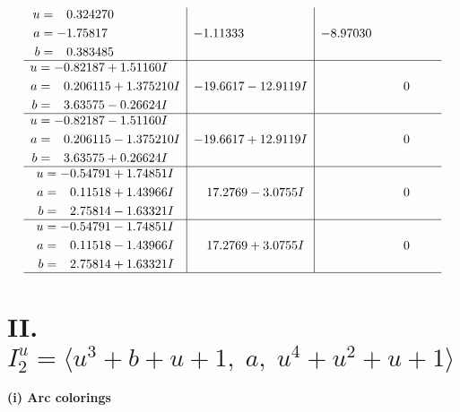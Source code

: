 \documentclass[1p]{elsarticle_modified}
\theoremstyle{definition}
\begin{document}
$$\begin{array}{c|c|c}
\begin{aligned}
u &= \phantom{-}0.324270\phantom{ +0.000000I} \\
a &= -1.75817\phantom{ +0.000000I} \\
b &= \phantom{-}0.383485\phantom{ +0.000000I}\end{aligned}
 & -1.11333\phantom{ +0.000000I} & -8.97030\phantom{ +0.000000I} \\ \hline\begin{aligned}
u &= -0.82187 + 1.51160 I \\
a &= \phantom{-}0.206115 + 1.375210 I \\
b &= \phantom{-}3.63575 - 0.26624 I\end{aligned}
 & -19.6617 - 12.9119 I & \phantom{-0.000000 } 0 \\ \hline\begin{aligned}
u &= -0.82187 - 1.51160 I \\
a &= \phantom{-}0.206115 - 1.375210 I \\
b &= \phantom{-}3.63575 + 0.26624 I\end{aligned}
 & -19.6617 + 12.9119 I & \phantom{-0.000000 } 0 \\ \hline\begin{aligned}
u &= -0.54791 + 1.74851 I \\
a &= \phantom{-}0.11518 + 1.43966 I \\
b &= \phantom{-}2.75814 - 1.63321 I\end{aligned}
 & \phantom{-}17.2769 - 3.0755 I & \phantom{-0.000000 } 0 \\ \hline\begin{aligned}
u &= -0.54791 - 1.74851 I \\
a &= \phantom{-}0.11518 - 1.43966 I \\
b &= \phantom{-}2.75814 + 1.63321 I\end{aligned}
 & \phantom{-}17.2769 + 3.0755 I & \phantom{-0.000000 } 0\\
 \hline 
 \end{array}$$\newpage\newpage\renewcommand{\arraystretch}{1}
\centering \section*{II. $I^u_{2}= \langle u^3+b+u+1,\;a,\;u^4+u^2+u+1 \rangle$}
\flushleft \textbf{(i) Arc colorings}\\
\end{document}

